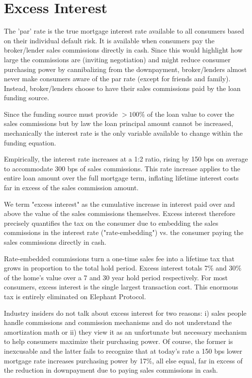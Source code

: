 \newpage
\chapter{Excess Interest}

The 'par' rate is the true mortgage interest rate available to all consumers based on their individual default risk. It is available when consumers pay the broker/lender sales commissions directly in cash. Since this would highlight how large the commissions are (inviting negotiation) and might reduce consumer purchasing power by cannibalizing from the downpayment, broker/lenders almost never make consumers aware of the par rate (except for friends and family). Instead, broker/lenders choose to have their sales commissions paid by the loan funding source.

Since the funding source must provide $>100\%$ of the loan value to cover the sales commissions but by law the loan principal amount cannot be increased, mechanically the interest rate is the only variable available to change within the funding equation.

Empirically, the interest rate increases at a 1:2 ratio, rising by 150 bps on average to accommodate 300 bps of sales commissions. This rate increase applies to the entire loan amount over the full mortgage term, inflating lifetime interest costs far in excess of the sales commission amount.

We term "excess interest" as the cumulative increase in interest paid over and above the value of the sales commissions themselves. Excess interest therefore precisely quantifies the tax on the consumer due to embedding the sales commissions in the interest rate ("rate-embedding") vs. the consumer paying the sales commissions directly in cash.

Rate-embedded commissions turn a one-time sales fee into a lifetime tax that grows in proportion to the total hold period. Excess interest totals 7\% and 30\% of the home's value over a 7 and 30 year hold period respectively. For most consumers, excess interest is the single largest transaction cost. This enormous tax is entirely eliminated on Elephant Protocol.

Industry insiders do not talk about excess interest for two reasons: i) sales people handle commissions and commission mechanisms and do not understand the amortization math or ii) they view it as an unfortunate but necessary mechanism to help consumers maximize their purchasing power. Of course, the former is inexcusable and the latter fails to recognize that at today's rate a 150 bps lower mortgage rate increases purchasing power by 17\%, all else equal, far in excess of the reduction in downpayment due to paying sales commissions in cash.